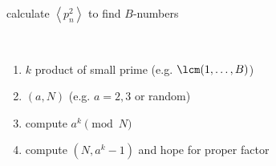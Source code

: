 \begin{example}
    calculate $\left< p_n^2 \right>$ to find $B$-numbers
\end{example}

\begin{example}\,
    \begin{enumerate}
        \item $k$ product of small prime (e.g. $\lcm(1, \dots, B)$)
        \item $(a, N)$ (e.g. $a = 2, 3$ or random)
        \item compute $a^k \pmod{N}$
        \item compute $(N, a^k - 1)$ and hope for proper factor
    \end{enumerate}
\end{example}


